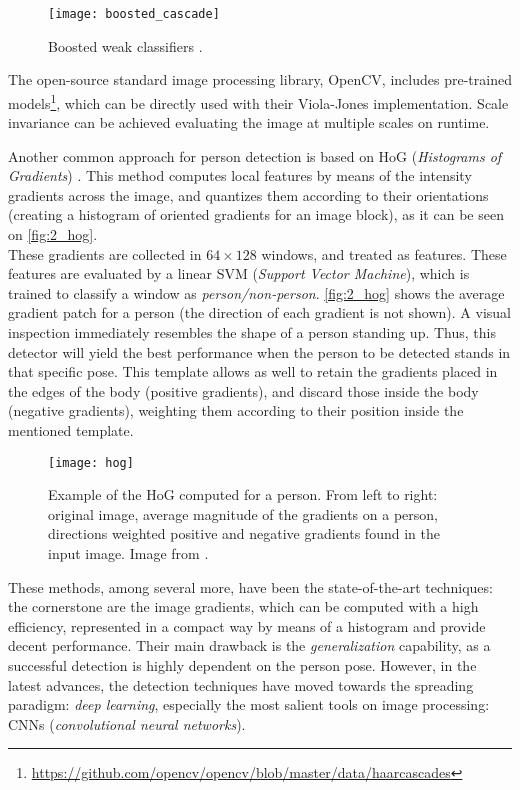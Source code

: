 \begin{figure}[h]
	\centering
	\texttt{[image: boosted\_cascade]}
	\caption{Boosted weak classifiers \cite{diapos_cv_clasif}.}
	\label{fig:2_violajones_boost}
\end{figure}

The open-source standard image processing library, OpenCV, includes pre-trained models\footnote{\url{https://github.com/opencv/opencv/blob/master/data/haarcascades}}, which can be directly used with their Viola-Jones implementation. Scale invariance can be achieved evaluating the image at multiple scales on runtime.


Another common approach for person detection is based on HoG (\textit{Histograms of Gradients}) \cite{hog_detection}. This method computes local features by means of the intensity gradients across the image, and quantizes them according to their orientations (creating a histogram of oriented gradients for an image block), as it can be seen on \autoref{fig:2_hog}.\\



These gradients are collected in $64 \times 128$ windows, and treated as features. These features are evaluated by a linear SVM (\textit{Support Vector Machine}), which is trained to classify a window as \textit{person/non-person}. \autoref{fig:2_hog} shows the average gradient patch for a person (the direction of each gradient is not shown). A visual inspection immediately resembles the shape of a person standing up. Thus, this detector will yield the best performance when the person to be detected stands in that specific pose. This template allows as well to retain the gradients placed in the edges of the body (positive gradients), and discard those inside the body (negative gradients), weighting them according to their position inside the mentioned template.


\begin{figure}[h]
	\centering
	\texttt{[image: hog]}
	\caption{Example of the HoG computed for a person. From left to right: original image, average magnitude of the gradients on a person, directions weighted positive and negative gradients found in the input image. Image from \cite{hog_detection}.}
	\label{fig:2_hog}
\end{figure}




These methods, among several more, have been the state-of-the-art techniques: the cornerstone are the image gradients, which can be computed with a high efficiency, represented in a compact way by means of a histogram and provide decent performance. Their main drawback is the \textit{generalization} capability, as a successful detection is highly dependent on the person pose. However, in the latest advances, the detection techniques have moved towards the spreading paradigm: \textit{deep learning}, especially the most salient tools on image processing: CNNs (\textit{convolutional neural networks}).\\

